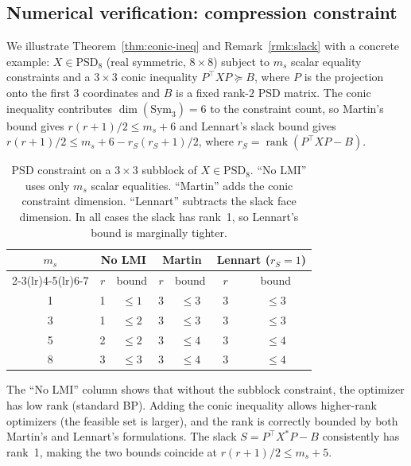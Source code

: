 \documentclass[11pt,a4paper]{article}
\theoremstyle{definition}
\newcommand{\rank}{\operatorname{rank}}
\newcommand{\PSD}{\mathrm{PSD}}
\newcommand{\Sym}{\mathrm{Sym}}
\begin{document}
\subsection{Numerical verification: compression constraint}

We illustrate Theorem~\ref{thm:conic-ineq} and
Remark~\ref{rmk:slack} with a concrete example: $X \in \PSD_8$
(real symmetric, $8 \times 8$) subject to $m_s$ scalar equality
constraints and a $3 \times 3$ conic inequality
$P^\top X P \succeq B$, where $P$ is the projection onto the
first 3 coordinates and $B$ is a fixed rank-$2$ PSD matrix.
The conic inequality contributes $\dim(\Sym_3) = 6$ to the
constraint count, so Martin's bound gives
$r(r{+}1)/2 \leq m_s + 6$ and Lennart's slack bound gives
$r(r{+}1)/2 \leq m_s + 6 - r_S(r_S{+}1)/2$,
where $r_S = \rank(P^\top X P - B)$.

\begin{table}[htbp]
\centering
\caption{PSD constraint on a $3 \times 3$ subblock of
$X \in \PSD_8$.  ``No LMI'' uses only $m_s$ scalar equalities.
``Martin'' adds the conic constraint dimension.  ``Lennart''
subtracts the slack face dimension.  In all cases the slack
has rank~1, so Lennart's bound is marginally tighter.}
\label{tab:compression}
\begin{tabular}{ccccccc}
\toprule
$m_s$ & \multicolumn{2}{c}{\textbf{No LMI}}
  & \multicolumn{2}{c}{\textbf{Martin}}
  & \multicolumn{2}{c}{\textbf{Lennart ($r_S = 1$)}} \\
\cmidrule(lr){2-3}\cmidrule(lr){4-5}\cmidrule(lr){6-7}
  & $r$ & bound & $r$ & bound & $r$ & bound \\
\midrule
1 & 1 & $\leq 1$ & 3 & $\leq 3$ & 3 & $\leq 3$ \\
3 & 1 & $\leq 2$ & 3 & $\leq 3$ & 3 & $\leq 3$ \\
5 & 2 & $\leq 2$ & 3 & $\leq 4$ & 3 & $\leq 4$ \\
8 & 3 & $\leq 3$ & 3 & $\leq 4$ & 3 & $\leq 4$ \\
\bottomrule
\end{tabular}
\end{table}

\noindent
The ``No LMI'' column shows that without the subblock constraint,
the optimizer has low rank (standard BP).  Adding the conic
inequality allows higher-rank optimizers (the feasible set is
larger), and the rank is correctly bounded by both Martin's and
Lennart's formulations.  The slack $S = P^\top X^* P - B$
consistently has rank~1, making the two bounds coincide at
$r(r{+}1)/2 \leq m_s + 5$.
\end{document}
